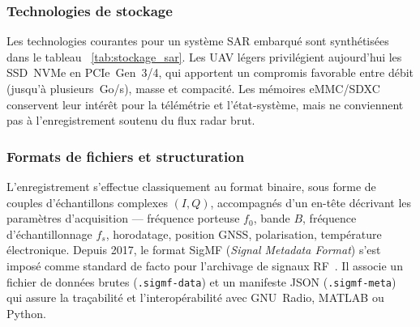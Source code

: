 \subsubsection{Technologies de stockage}

Les technologies courantes pour un système SAR embarqué sont synthétisées dans le tableau ~\ref{tab:stockage_sar}. Les UAV légers privilégient aujourd’hui les SSD~NVMe en PCIe~Gen~3/4, qui apportent un compromis favorable entre débit (jusqu’à plusieurs~Go/s), masse et compacité. Les mémoires eMMC/SDXC conservent leur intérêt pour la télémétrie et l’état-système, mais ne conviennent pas à l’enregistrement soutenu du flux radar brut.

\begin{table}[h!]
\centering
\label{tab:stockage_sar}
\renewcommand{\arraystretch}{1.1}
\caption{Comparatif des technologies de stockage pour applications SAR embarquées.}
\end{table}

\subsubsection{Formats de fichiers et structuration}

L’enregistrement s’effectue classiquement au format binaire, sous forme de couples d’échantillons complexes $(I,Q)$, accompagnés d’un en-tête décrivant les paramètres d’acquisition — fréquence porteuse $f_0$, bande $B$, fréquence d’échantillonnage $f_s$, horodatage, position GNSS, polarisation, température électronique. Depuis 2017, le format SigMF (\textit{Signal Metadata Format}) s’est imposé comme standard de facto pour l’archivage de signaux RF~\cite{Balister2017_SigMF}. Il associe un fichier de données brutes (\texttt{.sigmf-data}) et un manifeste JSON (\texttt{.sigmf-meta}) qui assure la traçabilité et l’interopérabilité avec GNU~Radio, MATLAB ou Python.

